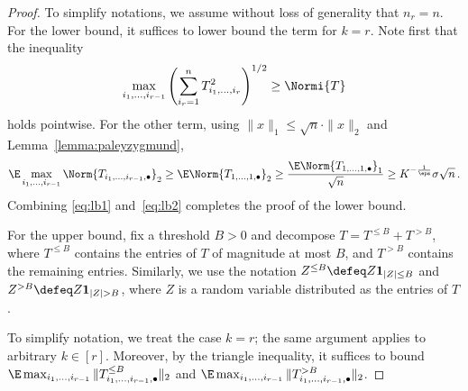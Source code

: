 \documentclass[11pt,a4paper]{article}
\begin{document}
\begin{proof}
    To simplify notations, we assume without loss of generality that $n_r=n$.
    For the lower bound, it suffices to lower bound the term for $k=r$. Note first that
    the inequality
    \begin{equation}
        \max_{i_1,\ldots,i_{r-1}} \left(\sum_{i_r=1}^n T_{i_1, \ldots, i_r}^2\right)^{1/2}\ge \Normi{T}\label{eq:lb1}
    \end{equation}
    holds pointwise. For the other term, using
    $\|x\|_1\le \sqrt n\cdot \|x\|_2$ and Lemma~\ref{lemma:paleyzygmund},
    \begin{equation}
        \E \max_{i_1, \ldots, i_{r-1}} \Norm{T_{i_1, \ldots, i_{r-1},\bullet}}_2\ge \E \Norm{T_{1,\ldots,1,\bullet}}_2\ge \frac {\E \Norm{T_{1,\ldots,1,\bullet}}_1} {\sqrt n} \ge K^{-\frac 1 \eps} \sigma \sqrt{n}\,.\label{eq:lb2}
    \end{equation}
    Combining \eqref{eq:lb1} and~\eqref{eq:lb2} completes the proof of the lower bound.
    
    For the upper bound, fix a threshold $B>0$ and decompose
    $T = T^{\le B} + T^{>B}$, where $T^{\le B}$ contains the entries of $T$
    of magnitude at most $B$, and $T^{>B}$ contains the remaining entries. Similarly, we use the notation
    $Z^{\le B}\defeq Z\mathbf 1_{|Z|\le B}$ and $Z^{>B}\defeq Z \mathbf 1_{|Z|>B}$, where $Z$ is a random variable distributed as the entries of $T$.
    
    To simplify notation, we treat the case $k=r$; the same argument applies to arbitrary $k\in [r]$.
    Moreover, by the triangle inequality, it suffices to bound $\E \max_{i_1, \ldots, i_{r-1}} \|T^{\le B}_{i_1, \ldots, i_{r-1},\bullet}\|_2$ and $\E \max_{i_1, \ldots, i_{r-1}} \|T^{>B}_{i_1, \ldots, i_{r-1},\bullet}\|_2$.


\end{proof}
\end{document}
